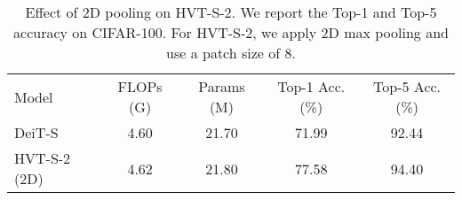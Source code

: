 \begin{table}[]
\centering
\caption{Effect of 2D pooling on HVT-S-2.  We report the Top-1 and Top-5 accuracy on CIFAR-100. For HVT-S-2, we apply 2D max pooling and use a patch size of 8.}
\vspace{-5pt}
\renewcommand\arraystretch{1.1}
\resizebox{\columnwidth}{!} {
\begin{tabular}{l|cccc}
Model        & FLOPs (G) & Params (M) & Top-1 Acc. (\%) & Top-5 Acc. (\%) \\ \shline
DeiT-S       & 4.60       & 21.70      & 71.99           & 92.44           \\
HVT-S-2 (2D) & 4.62      & 21.80      & 77.58           & 94.40           
\end{tabular}
}
\label{tab:2d_pooling}
\vspace{-15pt}
\end{table}